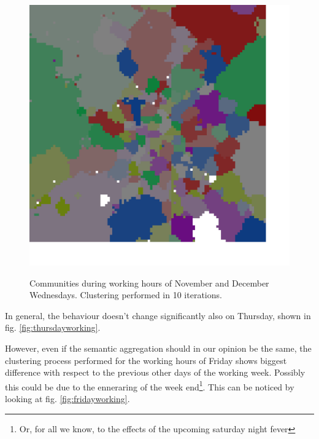 \documentclass[12pt,a4paper]{article}
\begin{document}
\begin{figure}[H]
\includegraphics[width=\linewidth]{week/3Wed.png}
\label{fig:wednesdayworking}
\caption{Communities during working hours of November and December Wednesdays. Clustering performed in 10 iterations.}
\end{figure}


In general, the behaviour doesn't change significantly also on Thursday, shown in fig. \ref{fig:thursdayworking}.

However, even if the semantic aggregation should in our opinion be the same, the clustering process performed for the working hours of Friday shows biggest difference with respect to the previous other days of the working week. Possibly this could be due to the enneraring of the week end\footnote{Or, for all we know, to the effects of the upcoming saturday night fever}. This can be noticed by looking at fig. \ref{fig:fridayworking}.
\end{document}
